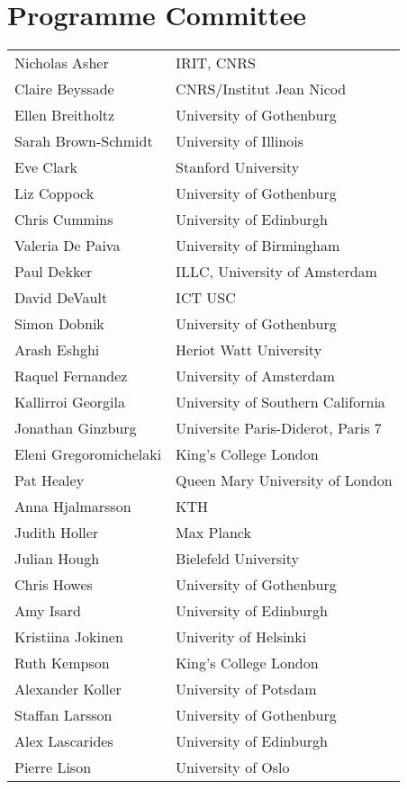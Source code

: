 \documentclass[a4paper,12pt,oneside]{book}
\begin{document}
\section*{Programme Committee}

\begin{longtable}{p{}p{}}
Nicholas Asher& IRIT, CNRS\\
Claire Beyssade & CNRS/Institut Jean Nicod\\
Ellen Breitholtz& University of Gothenburg\\
Sarah Brown-Schmidt & University of Illinois\\
Eve Clark& Stanford University\\
Liz Coppock& University of Gothenburg\\
Chris Cummins& University of Edinburgh\\
Valeria De Paiva& University of Birmingham\\
Paul Dekker& ILLC, University of Amsterdam\\
David DeVault& ICT USC\\
Simon Dobnik& University of Gothenburg\\
Arash Eshghi& Heriot Watt University\\
Raquel Fernandez& University of Amsterdam\\
Kallirroi Georgila& University of Southern California\\
Jonathan Ginzburg& Universite Paris-Diderot, Paris 7\\
Eleni Gregoromichelaki& King's College London\\
Pat Healey& Queen Mary University of London\\
Anna Hjalmarsson& KTH\\
Judith Holler& Max Planck\\
Julian Hough& Bielefeld University\\
Chris Howes& University of Gothenburg\\
Amy Isard& University of Edinburgh\\
Kristiina Jokinen& Univerity of Helsinki\\
Ruth Kempson& King's College London\\
Alexander Koller& University of Potsdam\\
Staffan Larsson& University of Gothenburg\\
Alex Lascarides& University of Edinburgh\\
Pierre Lison& University of Oslo\\

\end{longtable}
\end{document}
